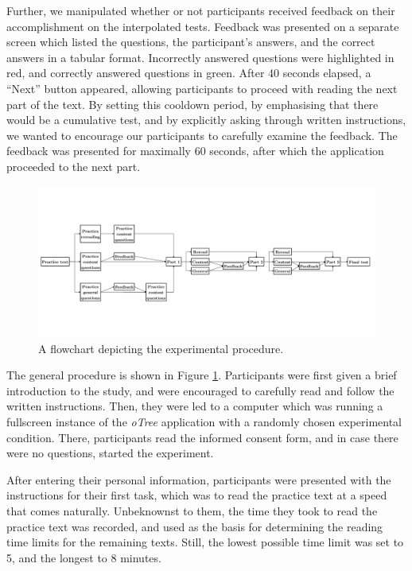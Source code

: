 Further, we manipulated whether or not participants received feedback on
their accomplishment on the interpolated tests. Feedback was presented
on a separate screen which listed the questions, the participant's
answers, and the correct answers in a tabular format. Incorrectly
answered questions were highlighted in red, and correctly answered
questions in green. After 40 seconds elapsed, a ``Next'' button
appeared, allowing participants to proceed with reading the next part of
the text. By setting this cooldown period, by emphasising that there
would be a cumulative test, and by explicitly asking through written
instructions, we wanted to encourage our participants to carefully
examine the feedback. The feedback was presented for maximally 60
seconds, after which the application proceeded to the next part.

\begin{figure}[p]
  \centering
  \includegraphics[width = 1.3\textwidth, keepaspectratio, angle = 90, trim = 0 0 0 0]{images/procedure.pdf}
  \caption{A flowchart depicting the experimental procedure.}
  \label{flowchart}
\end{figure}

The general procedure is shown in Figure \ref{flowchart}. Participants
were first given a brief introduction to the study, and were encouraged
to carefully read and follow the written instructions. Then, they were
led to a computer which was running a fullscreen instance of the
\textit{oTree} application with a randomly chosen experimental
condition. There, participants read the informed consent 
form, and in case there were no questions, started the 
experiment.

After entering their personal information, participants were presented
with the instructions for their first task, which was to read the
practice text at a speed that comes naturally. Unbeknownst to them, the time 
they took to read the practice text was recorded, and used as the basis for 
determining the reading time limits for the remaining texts. Still, the 
lowest possible time limit was set to 5, and the longest to 8 minutes.

